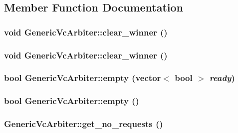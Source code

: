 \subsection{Member Function Documentation}
\hypertarget{classGenericVcArbiter_4cd15ea7b1b8ff50cbd9148826880fdf}{
\subsubsection[{clear\_\-winner}]{\setlength{\rightskip}{0pt plus 5cm}void GenericVcArbiter::clear\_\-winner ()}}
\label{classGenericVcArbiter_4cd15ea7b1b8ff50cbd9148826880fdf}


\hypertarget{classGenericVcArbiter_4cd15ea7b1b8ff50cbd9148826880fdf}{
\subsubsection[{clear\_\-winner}]{\setlength{\rightskip}{0pt plus 5cm}void GenericVcArbiter::clear\_\-winner ()}}
\label{classGenericVcArbiter_4cd15ea7b1b8ff50cbd9148826880fdf}


\hypertarget{classGenericVcArbiter_89fe4818dbc079a5305db9cfe23fd5a3}{
\subsubsection[{empty}]{\setlength{\rightskip}{0pt plus 5cm}bool GenericVcArbiter::empty (vector$<$ bool $>$ {\em ready})}}
\label{classGenericVcArbiter_89fe4818dbc079a5305db9cfe23fd5a3}


\hypertarget{classGenericVcArbiter_c03a3978b5564acfd561a097384570d5}{
\subsubsection[{empty}]{\setlength{\rightskip}{0pt plus 5cm}bool GenericVcArbiter::empty ()}}
\label{classGenericVcArbiter_c03a3978b5564acfd561a097384570d5}


\hypertarget{classGenericVcArbiter_0648f3756140fa6acc1e9345015b3461}{
\subsubsection[{get\_\-no\_\-requests}]{ GenericVcArbiter::get\_\-no\_\-requests ()}}
\label{classGenericVcArbiter_0648f3756140fa6acc1e9345015b3461}


